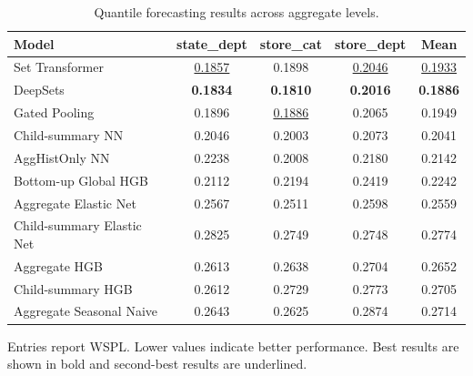 \begin{table}[H]
\centering
\caption{Quantile forecasting results across aggregate levels.}
\label{tab:main_quantile}
\begin{threeparttable}
\begin{tabular}{lcccc}
\toprule
Model & state\_dept & store\_cat & store\_dept & Mean \\
\midrule
Set Transformer & \underline{0.1857} & 0.1898 & \underline{0.2046} & \underline{0.1933} \\
DeepSets & \textbf{0.1834} & \textbf{0.1810} & \textbf{0.2016} & \textbf{0.1886} \\
Gated Pooling & 0.1896 & \underline{0.1886} & 0.2065 & 0.1949 \\
Child-summary NN & 0.2046 & 0.2003 & 0.2073 & 0.2041 \\
AggHistOnly NN & 0.2238 & 0.2008 & 0.2180 & 0.2142 \\
Bottom-up Global HGB & 0.2112 & 0.2194 & 0.2419 & 0.2242 \\
Aggregate Elastic Net & 0.2567 & 0.2511 & 0.2598 & 0.2559 \\
Child-summary Elastic Net & 0.2825 & 0.2749 & 0.2748 & 0.2774 \\
Aggregate HGB & 0.2613 & 0.2638 & 0.2704 & 0.2652 \\
Child-summary HGB & 0.2612 & 0.2729 & 0.2773 & 0.2705 \\
Aggregate Seasonal Naive & 0.2643 & 0.2625 & 0.2874 & 0.2714 \\
\bottomrule
\end{tabular}
\begin{tablenotes}
\footnotesize \item Entries report WSPL. Lower values indicate better performance. Best results are shown in bold and second-best results are underlined.
\end{tablenotes}
\end{threeparttable}
\end{table}
